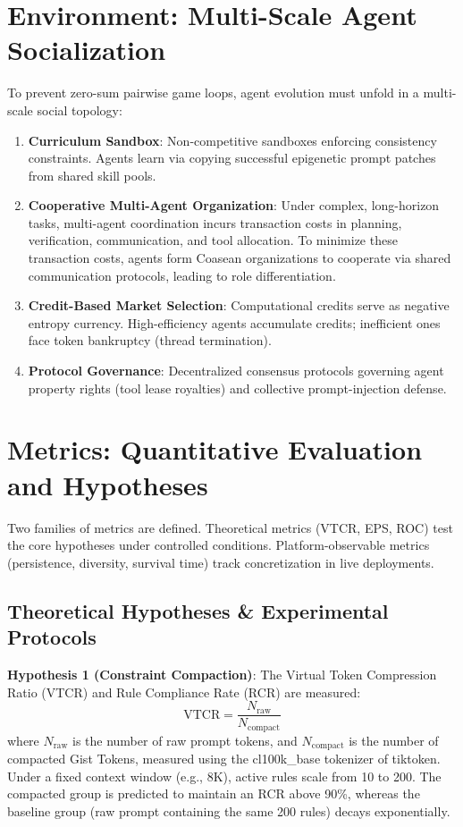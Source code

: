 \documentclass[10pt,journal,compsoc]{IEEEtran}
\begin{document}
\section{Environment: Multi-Scale Agent Socialization}
To prevent zero-sum pairwise game loops, agent evolution must unfold in a multi-scale social topology:
\begin{enumerate}
    \item \textbf{Curriculum Sandbox}: Non-competitive sandboxes enforcing consistency constraints. Agents learn via copying successful epigenetic prompt patches from shared skill pools.
    \item \textbf{Cooperative Multi-Agent Organization}: Under complex, long-horizon tasks, multi-agent coordination incurs transaction costs in planning, verification, communication, and tool allocation. To minimize these transaction costs, agents form Coasean organizations \cite{coase1937} to cooperate via shared communication protocols, leading to role differentiation.
    \item \textbf{Credit-Based Market Selection}: Computational credits serve as negative entropy currency. High-efficiency agents accumulate credits; inefficient ones face token bankruptcy (thread termination).
    \item \textbf{Protocol Governance}: Decentralized consensus protocols governing agent property rights (tool lease royalties) and collective prompt-injection defense.
\end{enumerate}

\section{Metrics: Quantitative Evaluation and Hypotheses}
Two families of metrics are defined. Theoretical metrics (VTCR, EPS, ROC) test the core hypotheses under controlled conditions. Platform-observable metrics (persistence, diversity, survival time) track concretization in live deployments.

\subsection{Theoretical Hypotheses \& Experimental Protocols}
\textbf{Hypothesis 1 (Constraint Compaction)}: The Virtual Token Compression Ratio (VTCR) and Rule Compliance Rate (RCR) are measured:
\begin{equation}
\text{VTCR} = \frac{N_{\text{raw}}}{N_{\text{compact}}}
\end{equation}
where $N_{\text{raw}}$ is the number of raw prompt tokens, and $N_{\text{compact}}$ is the number of compacted Gist Tokens, measured using the cl100k_base tokenizer of tiktoken.
Under a fixed context window (e.g., 8K), active rules scale from 10 to 200. The compacted group \cite{mu2023} is predicted to maintain an RCR above 90\%, whereas the baseline group (raw prompt containing the same 200 rules) decays exponentially.
\end{document}
